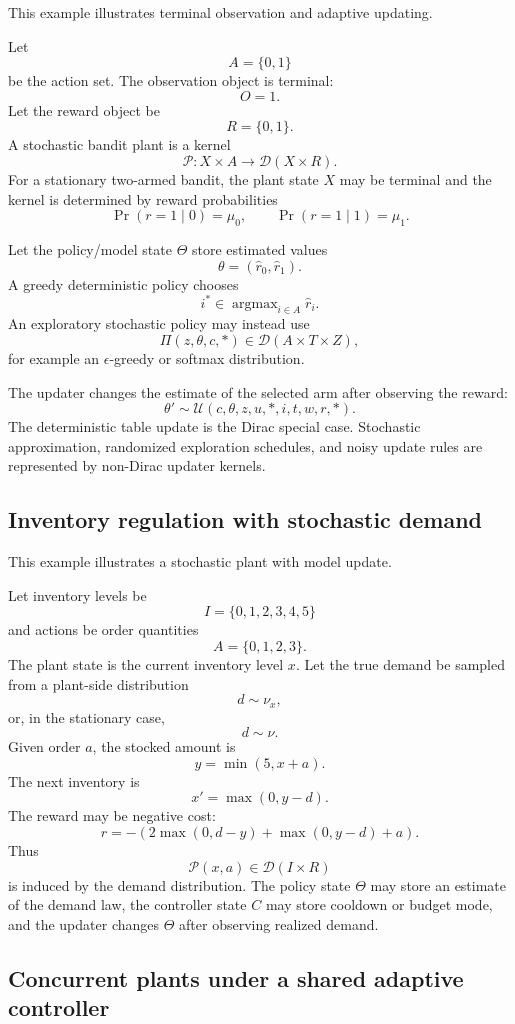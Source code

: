 This example illustrates terminal observation and adaptive updating.

Let
\[
A=\{0,1\}
\]
be the action set.  The observation object is terminal:
\[
O=1.
\]
Let the reward object be
\[
R=\{0,1\}.
\]
A stochastic bandit plant is a kernel
\[
\mathcal P:X\times A\to \mathcal D(X\times R).
\]
For a stationary two-armed bandit, the plant state \(X\) may be terminal and the kernel is
determined by reward probabilities
\[
\Pr(r=1\mid 0)=\mu_0,
\qquad
\Pr(r=1\mid 1)=\mu_1.
\]

Let the policy/model state \(\Theta\) store estimated values
\[
\theta=(\hat r_0,\hat r_1).
\]
A greedy deterministic policy chooses
\[
i^\ast\in\operatorname{argmax}_{i\in A}\hat r_i.
\]
An exploratory stochastic policy may instead use
\[
\Pi(z,\theta,c,\ast)\in\mathcal D(A\times T\times Z),
\]
for example an \(\epsilon\)-greedy or softmax distribution.

The updater changes the estimate of the selected arm after observing the reward:
\[
\theta'\sim \mathcal U(c,\theta,z,u,\ast,i,t,w,r,\ast).
\]
The deterministic table update is the Dirac special case.  Stochastic approximation, randomized
exploration schedules, and noisy update rules are represented by non-Dirac updater kernels.

\subsection{Inventory regulation with stochastic demand}
\label{subsec:stochastic-inventory-regulation}

This example illustrates a stochastic plant with model update.

Let inventory levels be
\[
I=\{0,1,2,3,4,5\}
\]
and actions be order quantities
\[
A=\{0,1,2,3\}.
\]
The plant state is the current inventory level \(x\).  Let the true demand be sampled from a
plant-side distribution
\[
d\sim \nu_x,
\]
or, in the stationary case,
\[
d\sim \nu.
\]
Given order \(a\), the stocked amount is
\[
y=\min(5,x+a).
\]
The next inventory is
\[
x'=\max(0,y-d).
\]
The reward may be negative cost:
\[
r=-(2\max(0,d-y)+\max(0,y-d)+a).
\]
Thus
\[
\mathcal P(x,a)
\in
\mathcal D(I\times R)
\]
is induced by the demand distribution.  The policy state \(\Theta\) may store an estimate of the
demand law, the controller state \(C\) may store cooldown or budget mode, and the updater changes
\(\Theta\) after observing realized demand.

\subsection{Concurrent plants under a shared adaptive controller}
\label{subsec:concurrent-plants-effectful}

